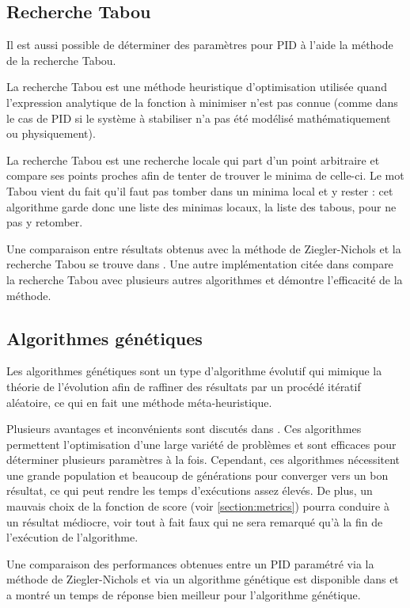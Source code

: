 \documentclass[a4paper,10pt]{report}
\begin{document}
\subsection{Recherche Tabou}

Il est aussi possible de déterminer des paramètres pour PID à l'aide la méthode de la recherche Tabou.

La recherche Tabou est une méthode heuristique d'optimisation utilisée quand l'expression analytique de la fonction à minimiser n'est pas connue
(comme dans le cas de PID si le système à stabiliser n'a pas été modélisé mathématiquement ou physiquement).

La recherche Tabou est une recherche locale qui part d'un point arbitraire et compare ses points proches afin de tenter de trouver le minima de celle-ci.
Le mot Tabou vient du fait qu'il faut pas tomber dans un minima local et y rester :
cet algorithme garde donc une liste des minimas locaux, la liste des tabous, pour ne pas y retomber.

Une comparaison entre résultats obtenus avec la méthode de Ziegler-Nichols et la recherche Tabou se trouve dans \cite{Karaboga569754}.
Une autre implémentation citée dans \cite{bagis2011tabu} compare la recherche Tabou avec plusieurs autres algorithmes et démontre l'efficacité de la méthode.

\subsection{Algorithmes génétiques}

Les algorithmes génétiques sont un type d'algorithme évolutif qui mimique la théorie de l'évolution afin de raffiner des résultats par un procédé itératif aléatoire, ce qui en fait une méthode méta-heuristique.

Plusieurs avantages et inconvénients sont discutés dans \cite{Tabassum2014}.
Ces algorithmes permettent l'optimisation d'une large variété de problèmes et sont efficaces pour déterminer plusieurs paramètres à la fois.
Cependant, ces algorithmes nécessitent une grande population et beaucoup de générations pour converger vers un bon résultat, ce qui peut rendre les temps d'exécutions assez élevés.
De plus, un mauvais choix de la fonction de score (voir \ref{section:metrics}) pourra conduire à un résultat médiocre, voir tout à fait faux qui ne sera remarqué qu'à la fin de l'exécution de l'algorithme.

Une comparaison des performances obtenues entre un PID paramétré via la méthode de Ziegler-Nichols et via un algorithme génétique est disponible dans \cite{thomas2009position} et a montré un temps de réponse bien meilleur pour l'algorithme génétique.
\end{document}
